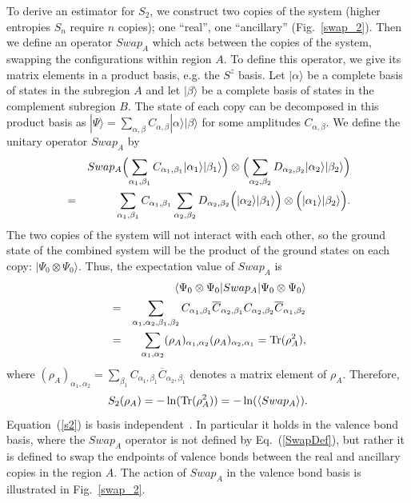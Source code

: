 \documentclass[prl,aps,twocolumn,floatfix,amsmath,amssymb,superscriptaddress,tightenlines]{revtex4}
\begin{document}
%
%
To derive an estimator for $S_2$, we construct two copies of the
system (higher entropies $S_n$ require $n$ copies);
one ``real'', one ``ancillary'' (Fig.~\ref{swap_2}). Then we define an
operator $Swap_A$ which acts between the copies of the system, swapping
the configurations within region $A$.  To define this operator, we
give its matrix elements in a product basis, e.g.  the
$S^z$ basis.  Let $|\alpha\rangle$  be a complete basis of states in the
subregion $A$ and let $|\beta\rangle$ be a complete basis of states in the
complement subregion $B$. The state of each copy can be decomposed
in this product basis as $|\Psi\rangle=\sum_{\alpha,\beta} C_{\alpha,\beta}
|\alpha\rangle | \beta \rangle$ for some amplitudes $C_{\alpha,\beta}$.
We define the unitary operator $Swap_A$ by
\begin{eqnarray}
\label{SwapDef}
&& Swap_A  \Bigl( \sum_{\alpha_1,\beta_1} C_{\alpha_1,\beta_1}|\alpha_1\rangle |\beta_1\rangle \Bigr) \otimes
\Bigl( \sum_{\alpha_2,\beta_2} D_{\alpha_2,\beta_2}|\alpha_2\rangle
|\beta_2\rangle \Bigr) \nonumber\\ &=&
\sum_{\alpha_1,\beta_1} C_{\alpha_1,\beta_1}
\sum_{\alpha_2,\beta_2} D_{\alpha_2,\beta_2}
\Bigl( |\alpha_2\rangle |\beta_1\rangle \Bigr) \otimes
\Bigl( |\alpha_1\rangle |\beta_2\rangle \Bigr).
\end{eqnarray}
The two copies of the system will not interact with each other, so the
ground state of the combined system will be the product of the ground states
on each copy:
$|\Psi_0\otimes \Psi_0\rangle$.  Thus, the expectation value
of $Swap_A$ is
\begin{eqnarray}
\label{H2fromSwap}
&& \langle \Psi_0\otimes \Psi_0|Swap_A|\Psi_0\otimes \Psi_0\rangle
\nonumber \\ 
&=& 
\sum_{\alpha_1,\alpha_2,\beta_1,\beta_2} C_{\alpha_1,\beta_1} \overline C_{\alpha_2,\beta_1} C_{\alpha_2,\beta_2} \overline C_{\alpha_1,\beta_2}
\nonumber \\
&=&
\sum_{\alpha_1,\alpha_2} (\rho_A)_{\alpha_1,\alpha_2}
(\rho_A)_{\alpha_2,\alpha_1}={\rm Tr}(\rho_A^2),
\end{eqnarray}
where $(\rho_A)_{\alpha_1,\alpha_2}=\sum_{\beta_1}C_{\alpha_1,\beta_1} \overline C_{\alpha_2,\beta_1}$
denotes a matrix element of $\rho_A$. Therefore, 
\begin{equation} 
\label{s2}
S_2(\rho_A) =-\ln({\rm Tr}(\rho_A^2))=-\ln(\langle Swap_A \rangle). 
\end{equation}
Equation~(\ref{s2}) is basis independent~\cite{Jaeger}. In particular it
holds in the valence bond basis, where the $Swap_A$ operator is not
defined by Eq.~(\ref{SwapDef}), but rather it is defined to swap the
endpoints of valence bonds between the real and ancillary copies in the
region $A$.  The action of $Swap_A$ in the valence bond basis is
illustrated in Fig.~\ref{swap_2}.  
\end{document}
